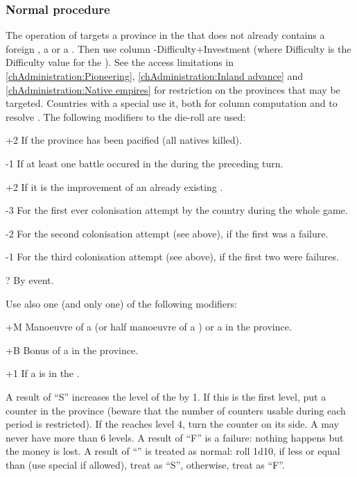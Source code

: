 \subsubsection{Normal procedure}
\aparag[Colonisation] The operation of  targets a province
in the \ROTW that does not already contains a foreign \COL, a  or a . Then use column
\FTI-Difficulty+Investment (where Difficulty is the Difficulty value for the
\Area).
\bparag See the access limitations in \ref{chAdministration:Pioneering},
\ref{chAdministration:Inland advance} and \ref{chAdministration:Native empires} for
restriction on the provinces that may be targeted.
\bparag Countries with a special \FTI use it, both for column computation and
to resolve \undemi.
\bparag The following modifiers to the die-roll are used:
\begin{modlist}
\item[+2]If the province has been pacified (all natives killed).
\item[-1]If at least one battle occured in the \Area during the preceding
  turn.
\item[+2]If it is the improvement of an already existing \COL.
\item[-3]For the first ever colonisation attempt by the country during the
  whole game.
\item[-2]For the second colonisation attempt (see above), if the first was a
  failure.
\item[-1]For the third colonisation attempt (see above), if the first two were
  failures.
\item[\textplusminus?]By event.
\end{modlist}
\bparag Use also one (and only one) of the following modifiers:
\begin{modlist}
\item[+M]Manoeuvre of a \LeaderC (or half manoeuvre of a \LeaderE) or a
  \LeaderGov in the province.
\item[+B]Bonus of a \LeaderMis in the province.
\item[+1]If a \LeaderGov is in the \Area.
\end{modlist}

\bparag A result of ``S'' increases the level of the \COL by 1. If this is the
first level, put a counter in the province (beware that the number of counters
usable during each period is restricted). If the \COL reaches level 4, turn
the counter on its \Faceplus side. A \COL may never have more than 6 levels.
\bparag A result of ``F'' is a failure: nothing happens but the money is lost.
\bparag A result of ``\undemi'' is treated as normal: roll 1d10, if less or
equal than \FTI (use special \FTI if allowed), treat as ``S'', otherwise,
treat as ``F''.

